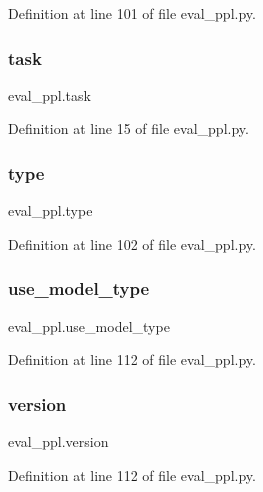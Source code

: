 Definition at line 101 of file eval\+\_\+ppl.\+py.

\mbox{\label{namespaceeval__ppl_acbb544905bfe31d80f56f1cdce37a02e}} 
\subsubsection{\texorpdfstring{task}{task}}
{\footnotesize\ttfamily eval\+\_\+ppl.\+task}



Definition at line 15 of file eval\+\_\+ppl.\+py.

\mbox{\label{namespaceeval__ppl_a6408f49f0c707952a277d838a5912296}} 
\subsubsection{\texorpdfstring{type}{type}}
{\footnotesize\ttfamily eval\+\_\+ppl.\+type}



Definition at line 102 of file eval\+\_\+ppl.\+py.

\mbox{\label{namespaceeval__ppl_a999a1365c520a22de49fc43a7003e7e6}} 
\subsubsection{\texorpdfstring{use\+\_\+model\+\_\+type}{use\_model\_type}}
{\footnotesize\ttfamily eval\+\_\+ppl.\+use\+\_\+model\+\_\+type}



Definition at line 112 of file eval\+\_\+ppl.\+py.

\mbox{\label{namespaceeval__ppl_a62dd1a0428eac48ca86fd9c3c97d12e2}} 
\subsubsection{\texorpdfstring{version}{version}}
{\footnotesize\ttfamily eval\+\_\+ppl.\+version}



Definition at line 112 of file eval\+\_\+ppl.\+py.


